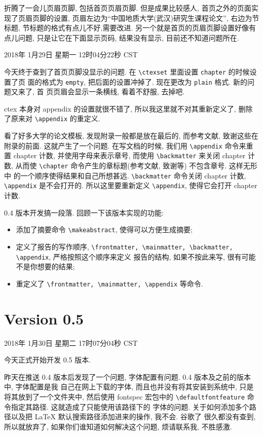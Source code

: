 \documentclass{cugrep}
\begin{document}
折腾了一会儿页眉页脚, 包括首页页眉页脚. 但是成果比较感人, 首页之外的页面实现了页眉页脚的设置,
页眉左边为``中国地质大学(武汉)研究生课程论文'', 右边为节标题, 节标题的格式有点儿不好,需要改进.
另一个就是首页的页眉页脚设置好像有点儿问题, 只是让它在下面显示页码, 结果没有显示, 目前还不知道问题所在. 

2018年 1月29日 星期一 12时04分22秒 CST

今天终于查到了首页页脚没显示的问题. 在 \verb|\ctexset| 里面设置 \verb|chapter| 的时候设置了页
面的格式为 \verb|empty|, 把后面的设置冲掉了. 现在更改为 \verb|plain| 格式. 新的问题又来了, 首
页页眉会显示一条横线, 看着不舒服, 去掉吧. 

ctex 本身对 appendix 的设置就很不错了, 所以我这里就不对其重新定义了, 删除了原来对 \verb|\appendix|
的重定义. 

看了好多大学的论文模板, 发现附录一般都是放在最后的, 而参考文献, 致谢这些在附录的前面. 这就产生了一个问题.
在写文档的时候, 我们用 \verb|\appendix| 命令来重置 chapter 计数, 并使用字母来表示章号, 而使用 \verb|\backmatter| 
来关闭 chapter 计数, 从而使 \verb|\chapter| 命令产生的章标题(参考文献, 致谢等) 不包含章号. 这样无形中
的一个顺序使得结果和自己所想甚远. \verb|\backmatter| 命令关闭 chapter 计数, \verb|\appendix| 是不会打开的.
所以这里要重新定义 \verb|\appendix|, 使得它会打开 chapter 计数. 

0.4 版本开发搞一段落. 回顾一下该版本实现的功能:

\begin{itemize}
    \item 添加了摘要命令 \verb|\makeabstract|, 使得可以方便生成摘要;
    \item 定义了报告的写作顺序, \verb|\frontmatter, \mainmatter, \backmatter, \appendix|, 严格按照这个顺序来定义
        报告的结构, 如果不按此来写, 很有可能不是你想要的结果;
    \item 重定义了 \verb|\frontmatter, \mainmatter, \appendix| 等命令.
\end{itemize}

\section{Version 0.5}

2018年 1月30日 星期二 17时07分04秒 CST

今天正式开始开发 0.5 版本.

昨天在推送 0.4 版本后发现了一个问题, 字体配置有问题. 0.4 版本及之前的版本中, 字体配置是我
自己在网上下载的字体, 而且也并没有将其安装到系统中, 只是将其放到了一个文件夹中, 然后使用
fontspec 宏包中的 \verb|\defaultfontfeature| 命令指定其路径. 这就造成了只能使用该路径下的
字体的问题. 关于如何添加多个路径以及把 \LaTeX{} 默认搜索路径添加进来的操作, 我不会. 谷歌了
很久都没有查到, 所以就放弃了, 如果你们谁知道如何解决这个问题, 烦请联系我, 不胜感激. 
\end{document}
